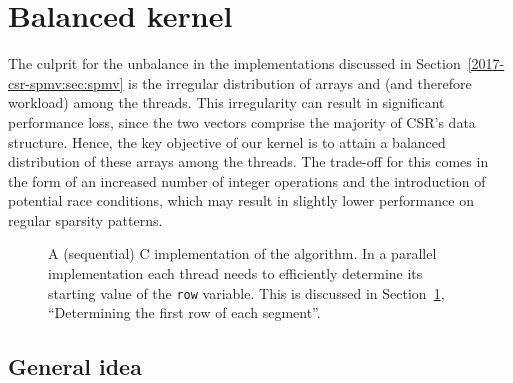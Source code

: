 \section{Balanced \spmv kernel}
\label{2017-csr-spmv:sec:kernel}

The culprit for the unbalance in the \spmv implementations
discussed in Section~\ref{2017-csr-spmv:sec:spmv}
is the irregular distribution of arrays \val and \colidx
(and therefore workload) among the threads.
This irregularity can result in significant performance loss,
since the two vectors comprise the majority of CSR's data structure.
Hence, the key objective of our kernel is to attain a balanced distribution of
these arrays among the threads.
The trade-off for this comes in the form of an increased number
of integer operations and the introduction of potential race conditions,
which may result in slightly lower performance on regular sparsity patterns.

\begin{figure}[t]
\begin{minipage}{\columnwidth}

\end{minipage}
\vspace*{-2ex}
    \caption{A (sequential) C implementation of the \bcsr algorithm.
        In a parallel implementation each thread needs to
        efficiently determine its starting value of the \texttt{row} variable.
        This is discussed in Section~\ref{2017-csr-spmv:sec:kernel}, ``Determining the first
        row of each segment''.}
\label{2017-csr-spmv:fig:spmvi}
\end{figure}

\subsection{General idea}

